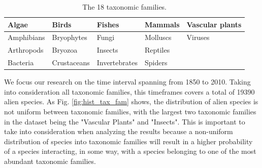 \documentclass[mscthesis]{usiinfthesis}
\begin{document}
\begin{table}[H]
\centering
\begin{tabular}{|l|l|l|l|l|}
\hline
Algae      & Birds       & Fishes        & Mammals  & Vascular plants \\ \hline
Amphibians & Bryophytes  & Fungi         & Molluscs & Viruses         \\ \hline
Arthropods & Bryozoa     & Insects       & Reptiles &                 \\ \hline
Bacteria   & Crustaceans & Invertebrates & Spiders  &                 \\ \hline             
\end{tabular}
\caption{The 18 taxonomic families.}
\label{table:families}
\end{table}

We focus our research on the time interval spanning from 1850 to 2010. Taking into consideration all taxonomic families, this timeframes covers a total of 19390 alien species. As Fig. \ref{fig:hist_tax_fam} shows, the distribution of alien species is not uniform between taxonomic families, with the largest two taxonomic families in the dataset being the "Vascular Plants" and "Insects". This is important to take into consideration when analyzing the results because a non-uniform distribution of species into taxonomic families will result in a higher probability of a species interacting, in some way, with a species belonging to one of the most abundant taxonomic families.
\end{document}
